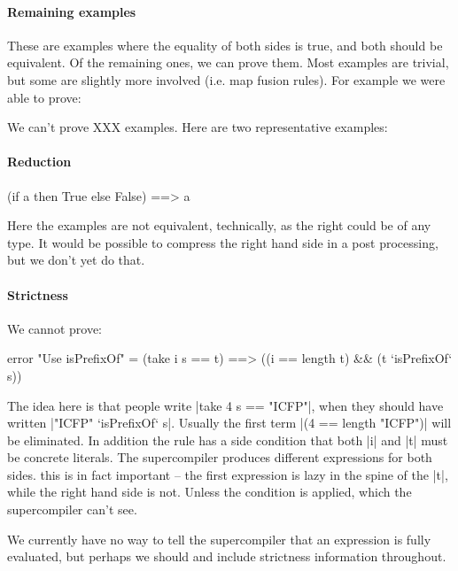 \documentclass{sigplanconf}
\newcommand{\unknown}{XXX}
\begin{document}
\paragraph{Remaining examples}

These are examples where the equality of both sides is true, and both should be equivalent. Of the remaining ones, we can prove them. Most examples are trivial, but some are slightly more involved (i.e. map fusion rules). For example we were able to prove:

\begin{code}
\end{code}

We can't prove \unknown{} examples. Here are two representative examples:

\paragraph{Reduction}

\begin{code}
(if a then True else False) ==> a
\end{code}

Here the examples are not equivalent, technically, as the right could be of any type. It would be possible to compress the right hand side in a post processing, but we don't yet do that.

\paragraph{Strictness}

We cannot prove:

\begin{code}
error "Use isPrefixOf" = (take i s == t) ==> ((i == length t) && (t `isPrefixOf` s))
\end{code}

The idea here is that people write |take 4 s == "ICFP"|, when they should have written |"ICFP" `isPrefixOf` s|. Usually the first term |(4 == length "ICFP")| will be eliminated. In addition the rule has a side condition that both |i| and |t| must be concrete literals. The supercompiler produces different expressions for both sides. this is in fact important -- the first expression is lazy in the spine of the |t|, while the right hand side is not. Unless the condition is applied, which the supercompiler can't see.

We currently have no way to tell the supercompiler that an expression is fully evaluated, but perhaps we should and include strictness information throughout.
\end{document}
